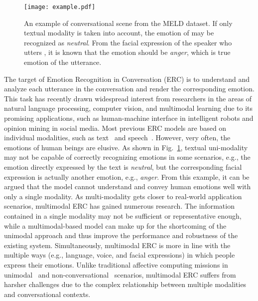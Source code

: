 \documentclass[journal]{IEEEtran}
\begin{document}
\begin{figure}[htbp]
    \centering
    \texttt{[image: example.pdf]}
    \caption{An example of conversational scene from the MELD dataset. If only textual modality is taken into account, the emotion of  may be recognized as \textit{neutral}. From the facial expression of the speaker who utters , it is known that the emotion should be \textit{anger}, which is true emotion of the utterance.}
    \label{fig:example}
\end{figure}
The target of Emotion Recognition in Conversation (ERC) is to understand and analyze each utterance in the conversation and render the corresponding emotion. This task has recently drawn widespread interest from researchers in the areas of natural language processing, computer vision, and multimodal learning due to its promising applications, such as human-machine interface in intelligent robots and opinion mining in social media. Most previous ERC models are based on individual modalities, such as text~\cite{jiao2020real,shen2021dialogxl,nie2022igcn,zhao2022cauain,li2022contrast} and speech~\cite{fan2022isnet,latif2022multitask,lei2022bat,zhou2022multiclassifier}. However, very often, the emotions of human beings are elusive. As shown in Fig.~\ref{fig:example}, textual uni-modality may not be capable of correctly recognizing emotions in some scenarios, e.g., the emotion directly expressed by the text is \textit{neutral}, but the corresponding facial expression is actually another emotion, e.g., \textit{anger}. From this example, it can be argued that the model cannot understand and convey human emotions well with only a single modality. As multi-modality gets closer to real-world application scenarios, multimodal ERC has gained numerous research. The information contained in a single modality may not be sufficient or representative enough, while a multimodal-based model can make up for the shortcoming of the unimodal approach and thus improve the performance and robustness of the existing system. Simultaneously, multimodal ERC is more in line with the multiple ways (e.g., language, voice, and facial expressions) in which people express their emotions. Unlike traditional affective computing missions in unimodal~\cite{jiao2020real,shen2021dialogxl,li2022contrast} and non-conversational~\cite{he2023multimodal,mai2022hybrid,yu2021learning} scenarios, multimodal ERC suffers from harsher challenges due to the complex relationship between multiple modalities and conversational contexts.
\end{document}
